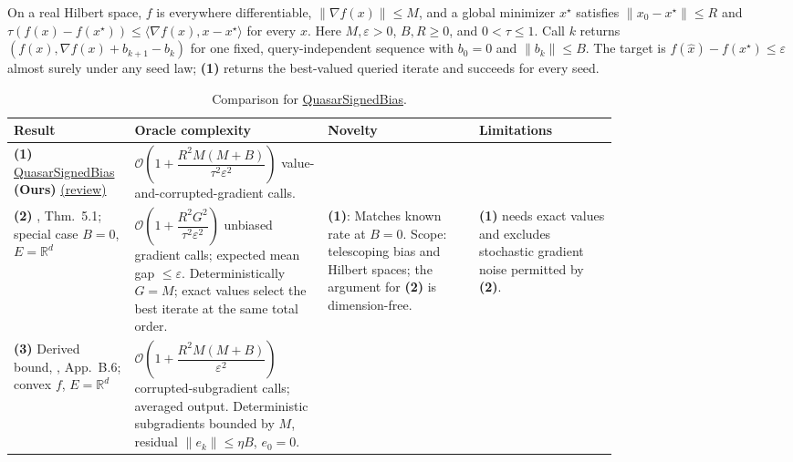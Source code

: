 \begin{table}[tp]
\centering
\caption{Comparison for \href{https://github.com/k3nfalt/longtails/blob/main/LongTails/Setups/QuasarSignedBias.lean}{QuasarSignedBias}.}\label{tab:QuasarSignedBias}
\parbox{\linewidth}{\footnotesize On a real Hilbert space, $f$ is everywhere differentiable, $\|\nabla f(x)\|\le M$, and a global minimizer $x^\star$ satisfies $\|x_0-x^\star\|\le R$ and $\tau(f(x)-f(x^\star))\le\langle\nabla f(x),x-x^\star\rangle$ for every $x$. Here $M,\varepsilon>0$, $B,R\ge0$, and $0<\tau\le1$. Call $k$ returns $(f(x),\nabla f(x)+b_{k+1}-b_k)$ for one fixed, query-independent sequence with $b_0=0$ and $\|b_k\|\le B$. The target is $f(\widehat x)-f(x^\star)\le\varepsilon$ almost surely under any seed law; \textbf{(1)} returns the best-valued queried iterate and succeeds for every seed.}\par\smallskip
\begin{threeparttable}
\footnotesize
\setlength{\tabcolsep}{4pt}\renewcommand{\arraystretch}{1.25}
\begin{tabularx}{\linewidth}{@{}>{\raggedright\arraybackslash}p{0.20\linewidth}>{\raggedright\arraybackslash}p{0.32\linewidth}>{\raggedright\arraybackslash}p{0.25\linewidth}>{\raggedright\arraybackslash}X@{}}
\toprule
\textbf{Result} & \textbf{Oracle complexity} & \textbf{Novelty} & \textbf{Limitations} \\
\midrule
\textbf{(1)} \href{https://github.com/k3nfalt/longtails/blob/main/LongTails/Theorems/QuasarSignedBias.lean}{Quasar\allowbreak Signed\allowbreak Bias} \textbf{(Ours)} \href{https://github.com/k3nfalt/longtails/blob/main/scripts/reviews/QuasarSignedBias.md}{(review)}
& $\mathcal{O}\!\left(1+\dfrac{R^2M(M+B)}{\tau^2\varepsilon^2}\right)$ value-and-corrupted-gradient calls.
& & \\
\midrule[1.2pt]
\textbf{(2)} \citep{qsbJin2020v3}, Thm.~5.1; special case $B=0$, $E=\mathbb R^d$
& $\mathcal{O}\!\left(1+\dfrac{R^2G^2}{\tau^2\varepsilon^2}\right)$ unbiased gradient calls; expected mean gap $\le\varepsilon$. Deterministically $G=M$; exact values select the best iterate at the same total order.
& \textbf{(1)}: Matches known rate at $B=0$. Scope: telescoping bias and Hilbert spaces; the argument for \textbf{(2)} is dimension-free.
& \textbf{(1)} needs exact values and excludes stochastic gradient noise permitted by \textbf{(2)}. \\
\midrule
\textbf{(3)} Derived bound, \citep{qsbKarimireddy2019}, App.~B.6; convex $f$, $E=\mathbb R^d$
& $\mathcal{O}\!\left(1+\dfrac{R^2M(M+B)}{\varepsilon^2}\right)$ corrupted-subgradient calls; averaged output. Deterministic subgradients bounded by $M$, residual $\|e_k\|\le\eta B$, $e_0=0$.

\end{tabularx}
\end{threeparttable}
\end{table}
